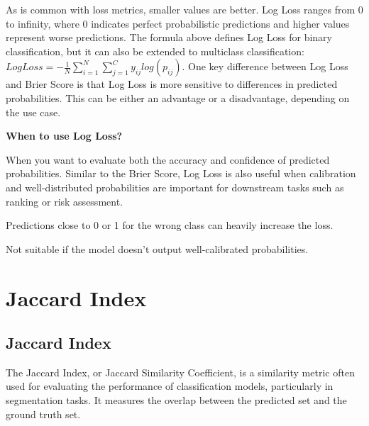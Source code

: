 As is common with loss metrics, smaller values are better. Log Loss ranges from 0 to infinity, where 0 indicates perfect probabilistic predictions and higher values
represent worse predictions. The formula above defines Log Loss for binary classification, but it can also be extended to multiclass classification:  
$Log Loss = -\frac{1}{N} \sum_{i=1}^{N} \sum_{j=1}^{C} y_{ij} log(p_{ij})$.
One key difference between Log Loss and Brier Score is that Log Loss is more sensitive to differences in predicted probabilities. This can be either an advantage or a
disadvantage, depending on the use case.


\textbf{When to use Log Loss?}

When you want to evaluate both the accuracy and confidence of predicted probabilities. Similar to the Brier Score, Log Loss is also useful when calibration
and well-distributed probabilities are important for downstream tasks such as ranking or risk assessment.

{
    \item Predictions close to 0 or 1 for the wrong class can heavily increase the loss.
    \item Not suitable if the model doesn't output well-calibrated probabilities.
}

\clearpage
\thispagestyle{classificationstyle}
\section{Jaccard Index}
\subsection{Jaccard Index}

The Jaccard Index, or Jaccard Similarity Coefficient, is a similarity metric often used for evaluating the performance of classification models,
particularly in segmentation tasks. It measures the overlap between the predicted set and the ground truth set.

\begin{center}
\end{center}

